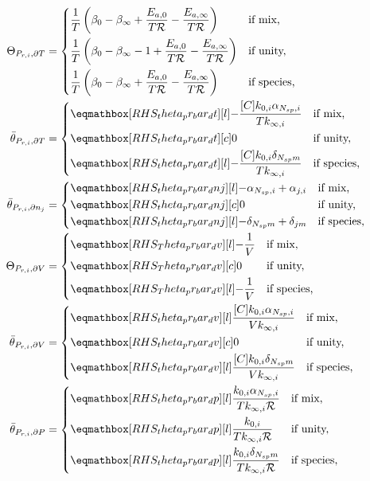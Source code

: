 \documentclass[12pt]{article}
\newcommand{\ns}{N_{sp}}
\newcommand{\Ru}{\mathcal{R}}
\begin{document}
\begin{align}
 \label{e:dpr_theta}
 \Theta_{P_{r,i}, \partial T} &=
 \begin{dcases}
  \frac{1}{T} \left(\beta_{0} - \beta_{\infty} + \frac{E_{a, 0}}{T \Ru} - \frac{E_{a, \infty}}{T \Ru}\right) & \text{if mix,} \\
  \frac{1}{T} \left(\beta_{0} - \beta_{\infty} - 1 + \frac{E_{a, 0}}{T \Ru} - \frac{E_{a, \infty}}{T \Ru}\right) & \text{if unity,} \\
  \frac{1}{T} \left(\beta_{0} - \beta_{\infty} + \frac{E_{a, 0}}{T \Ru} - \frac{E_{a, \infty}}{T \Ru}\right) & \text{if species,}
 \end{dcases} \\
 \bar{\theta}_{P_{r, i}, \partial T} &=
 \begin{dcases}
  \rhs{theta_pr_bar_dt}{- \frac{[C] k_{0, i} \alpha_{\ns,i}}{T k_{\infty, i}}} & \text{if mix,} \\
  \rhs{theta_pr_bar_dt}{0}[c] & \text{if unity,} \\
  \rhs{theta_pr_bar_dt}{- \frac{[C] k_{0, i} \delta_{\ns m}}{T k_{\infty, i}}} & \text{if species,}
 \end{dcases} \\
 \bar{\theta}_{P_{r, i}, \partial n_j} &=
 \begin{dcases}
  \rhs{theta_pr_bar_dnj}{- \alpha_{\ns,i} + \alpha_{j,i}} & \text{if mix,} \\
  \rhs{theta_pr_bar_dnj}{0}[c] & \text{if unity,}  \\
  \rhs{theta_pr_bar_dnj}{- \delta_{\ns m} + \delta_{j m}} & \text{if species,}
 \end{dcases} \\
 \Theta_{P_{r,i}, \partial V} &=
 \begin{dcases}
  \rhs{Theta_pr_bar_dv}{- \frac{1}{V}} & \text{if mix,} \\
  \rhs{Theta_pr_bar_dv}{0}[c] & \text{if unity,}  \\
  \rhs{Theta_pr_bar_dv}{- \frac{1}{V}} & \text{if species,}
 \end{dcases} \\
 \bar{\theta}_{P_{r, i}, \partial V} &=
 \begin{dcases}
  \rhs{theta_pr_bar_dv}{\frac{[C] k_{0, i} \alpha_{\ns,i}}{V k_{\infty, i}}} & \text{if mix,} \\
  \rhs{theta_pr_bar_dv}{0}[c] & \text{if unity,}  \\
  \rhs{theta_pr_bar_dv}{\frac{[C] k_{0, i} \delta_{\ns m}}{V k_{\infty, i}}} & \text{if species,}
 \end{dcases} \\
 \bar{\theta}_{P_{r, i}, \partial P} &=
 \begin{dcases}
  \rhs{theta_pr_bar_dp}{\frac{k_{0, i} \alpha_{\ns,i}}{T k_{\infty, i} \Ru}} & \text{if mix,} \\
  \rhs{theta_pr_bar_dp}{\frac{k_{0, i}}{T k_{\infty, i} \Ru}} & \text{if unity,}  \\
  \rhs{theta_pr_bar_dp}{\frac{k_{0, i} \delta_{\ns m}}{T k_{\infty, i} \Ru}} & \text{if species,}
 \end{dcases} \\
\end{align}
\end{document}
